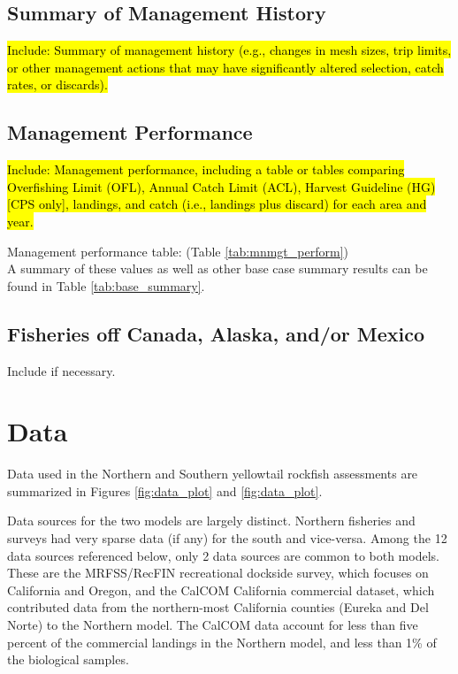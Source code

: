 \documentclass[12pt,]{article}
\begin{document}
\subsection{Summary of Management
History}\label{summary-of-management-history}

\hl{Include: Summary of management history (e.g., changes in mesh sizes, trip 
limits, or other management actions that may have significantly altered selection, 
catch rates, or discards).}

\subsection{Management Performance}\label{management-performance-1}

\hl{Include: Management performance, including a table or tables comparing 
Overfishing Limit (OFL), Annual Catch Limit (ACL), Harvest Guideline (HG) 
[CPS only], landings, and catch (i.e., landings plus discard) for each area and year.}

Management performance table: (Table \ref{tab:mnmgt_perform})\\
A summary of these values as well as other base case summary results can
be found in Table \ref{tab:base_summary}.

\subsection{Fisheries off Canada, Alaska, and/or
Mexico}\label{fisheries-off-canada-alaska-andor-mexico}

Include if necessary.

\newpage

\captionsetup[table]{labelformat=empty,justification=raggedright,font=bf, singlelinecheck=false}

\section{Data}\label{data}

Data used in the Northern and Southern yellowtail rockfish assessments
are summarized in Figures \ref{fig:data_plot} and \ref{fig:data_plot}.

Data sources for the two models are largely distinct. Northern fisheries
and surveys had very sparse data (if any) for the south and vice-versa.
Among the 12 data sources referenced below, only 2 data sources are
common to both models. These are the MRFSS/RecFIN recreational dockside
survey, which focuses on California and Oregon, and the CalCOM
California commercial dataset, which contributed data from the
northern-most California counties (Eureka and Del Norte) to the Northern
model. The CalCOM data account for less than five percent of the
commercial landings in the Northern model, and less than 1\% of the
biological samples.
\end{document}
